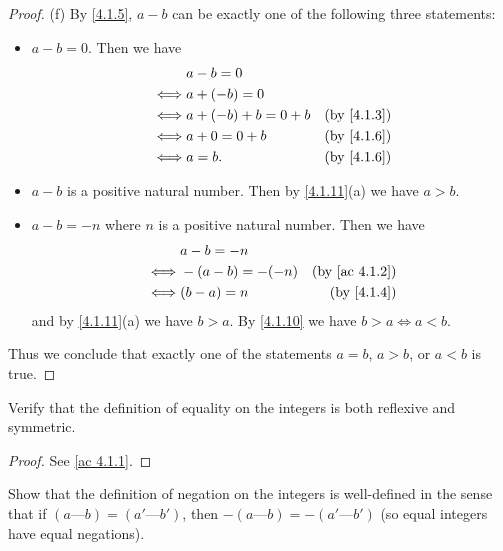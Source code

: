 \begin{proof}{(f)}
  By \cref{4.1.5}, \(a - b\) can be exactly one of the following three statements:
  \begin{itemize}
    \item \(a - b = 0\).
          Then we have
          \begin{align*}
                 & a - b = 0                                       \\
            \iff & a + (-b) = 0                                    \\
            \iff & a + (-b) + b = 0 + b & \text{(by \cref{4.1.3})} \\
            \iff & a + 0 = 0 + b        & \text{(by \cref{4.1.6})} \\
            \iff & a = b.               & \text{(by \cref{4.1.6})}
          \end{align*}
    \item \(a - b\) is a positive natural number.
          Then by \cref{4.1.11}(a) we have \(a > b\).
    \item \(a - b = -n\) where \(n\) is a positive natural number.
          Then we have
          \begin{align*}
                 & a - b = -n                                     \\
            \iff & -(a - b) = -(-n) & \text{(by \cref{ac 4.1.2})} \\
            \iff & (b - a) = n      & \text{(by \cref{4.1.4})}
          \end{align*}
          and by \cref{4.1.11}(a) we have \(b > a\).
          By \cref{4.1.10} we have \(b > a \iff a < b\).
  \end{itemize}
  Thus we conclude that exactly one of the statements \(a = b\), \(a > b\), or \(a < b\) is true.
\end{proof}

\exercisesection

\begin{exercise}\label{ex 4.1.1}
  Verify that the definition of equality on the integers is both reflexive and symmetric.
\end{exercise}

\begin{proof}
  See \cref{ac 4.1.1}.
\end{proof}

\begin{exercise}\label{ex 4.1.2}
  Show that the definition of negation on the integers is well-defined in the sense that if \((a \text{---} b) = (a' \text{---} b')\), then \(-(a \text{---} b) = -(a' \text{---} b')\)
  (so equal integers have equal negations).
\end{exercise}

